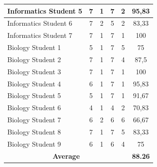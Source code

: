 \documentclass[conference,a4paper]{IEEEtran}
\begin{document}
\begin{table}[htbp]
{\begin{tabular}{|l|c|c|c|c|c|}
      Informatics Student 5                  & 7                                             & 1                                     & 7          & 2          & 95,83 \\ \hline
      Informatics Student 6                  & 7                                             & 2                                     & 5          & 2          & 83,33 \\ \hline
      Informatics Student 7                  & 7                                             & 1                                     & 7          & 1          & 100   \\ \hline
      Biology Student 1                      & 5                                             & 1                                     & 7          & 5          & 75    \\ \hline
      Biology Student 2                      & 7                                             & 1                                     & 7          & 4          & 87,5  \\ \hline
      Biology Student 3                      & 7                                             & 1                                     & 7          & 1          & 100   \\ \hline
      Biology Student 4                      & 6                                             & 1                                     & 7          & 1          & 95,83 \\ \hline
      Biology Student 5                      & 5                                             & 1                                     & 7          & 1          & 91,67 \\ \hline
      Biology Student 6                      & 4                                             & 1                                     & 4          & 2          & 70,83 \\ \hline
      Biology Student 7                      & 6                                             & 2                                     & 6          & 6          & 66,67 \\ \hline
      Biology Student 8                      & 7                                             & 1                                     & 7          & 5          & 83,33 \\ \hline
      Biology Student 9                      & 6                                             & 1                                     & 6          & 4          & 75    \\ \hline

      \multicolumn{5}{|c|}{\textbf{Average}} & \textbf{88.26}                                                                                                          \\ \hline
    \end{tabular}%
  }
\end{table}
\end{document}
